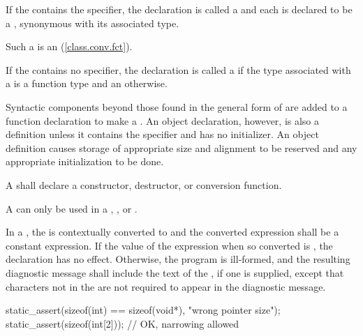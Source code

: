 \pnum
If the  contains the 
specifier, the declaration is called a 
and each 
is declared to be a , synonymous with its
associated type.
\begin{note}
Such a  is an 
(\ref{class.conv.fct}).
\end{note}
If the
 contains no  specifier, the
declaration is called a  if
the type associated with a  is a function type and
an  otherwise.

\pnum
{}%
Syntactic components beyond those found in the general form of
 are added to a function declaration to make a
. An object declaration, however, is also
a definition unless it contains the  specifier and has no
initializer.
%
An object definition causes storage of appropriate size and alignment to be reserved and
any appropriate initialization to be done.

\pnum
A  shall declare a
constructor, destructor, or conversion function.
\begin{note}
A  can only be used in a
,
, or
.
\end{note}

\pnum
{}%
In a ,
the 
is contextually converted to  and
the converted expression shall be a constant expression.
If the value of the expression when
so converted is , the declaration has no
effect. Otherwise, the program is ill-formed, and the resulting
diagnostic message shall include the text of
the , if one is supplied,
except that characters not in the  are not required to appear in
the diagnostic message.
\begin{example}
\begin{codeblock}
static_assert(sizeof(int) == sizeof(void*), "wrong pointer size");
static_assert(sizeof(int[2]));          // OK, narrowing allowed
\end{codeblock}
\end{example}

